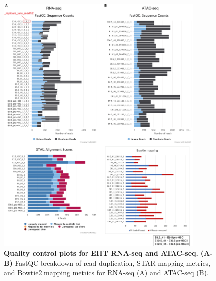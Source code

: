 \begin{figure}[p]
    \centering
    \includegraphics[width=0.9\textwidth,height=0.9\textheight,keepaspectratio]{figures/appendix/app_eht-qc.png}
    \caption[{Quality control plots for EHT RNA-seq and ATAC-seq.}]
    {\textbf{Quality control plots for EHT RNA-seq and ATAC-seq.} 
    \textbf{(A-B)} FastQC breakdown of read duplication, STAR mapping metrics, and Bowtie2 mapping metrics for RNA-seq (A) and ATAC-seq (B).
    }
    \label{fig:app_eht-qc}
\end{figure}
\clearpage

